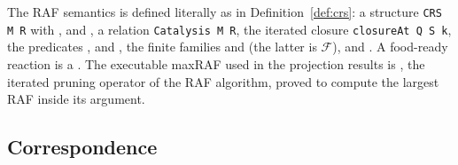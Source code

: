 \documentclass[11pt,a4paper]{article}
\theoremstyle{plain}
\theoremstyle{definition}
\theoremstyle{remark}
\newcommand{\FF}{\mathcal F}
\begin{document}
The RAF semantics is defined literally as in Definition~\ref{def:crs}: a structure
\texttt{CRS M R} with ,  and , a relation
\texttt{Catalysis M R}, the iterated closure \texttt{closureAt Q S k}, the predicates
,  and , the finite families
 and  (the latter is $\FF$), and . A
food-ready reaction is a . The executable maxRAF used in the
projection results is , the iterated pruning operator of
the RAF algorithm, proved to compute the largest RAF inside its argument.

\subsection{Correspondence}
\end{document}
